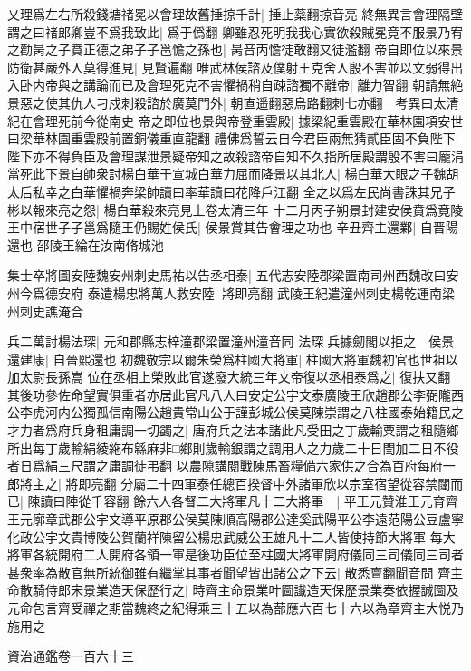 乂理爲左右所殺錢塘禇冕以會理故舊捶掠千計|{
	捶止蘂翻掠音亮}
終無異言會理隔壁謂之曰禇郎卿豈不爲我致此|{
	爲于僞翻}
卿雖忍死明我我心實欲殺賊冕竟不服景乃宥之勸昺之子賁正德之弟子子邕憺之孫也|{
	昺音丙憺徒敢翻又徒濫翻}
帝自即位以來景防衛甚嚴外人莫得進見|{
	見賢遍翻}
唯武林侯諮及僕射王克舍人殷不害並以文弱得出入卧内帝與之講論而已及會理死克不害懼禍稍自疎諮獨不離帝|{
	離力智翻}
朝請無絶景惡之使其仇人刁戍刺殺諮於廣莫門外|{
	朝直遥翻惡烏路翻刺七亦翻　考異曰太清紀在會理死前今從南史}
帝之即位也景與帝登重雲殿|{
	據梁紀重雲殿在華林園項安世曰梁華林園重雲殿前置銅儀重直龍翻}
禮佛爲誓云自今君臣兩無猜貳臣固不負陛下陛下亦不得負臣及會理謀泄景疑帝知之故殺諮帝自知不久指所居殿謂殷不害曰龐涓當死此下景自帥衆討楊白華于宣城白華力屈而降景以其北人|{
	楊白華大眼之子魏胡太后私幸之白華懼禍奔梁帥讀曰率華讀曰花降戶江翻}
全之以爲左民尚書誅其兄子彬以報來亮之怨|{
	楊白華殺來亮見上卷太清三年}
十二月丙子朔景封建安侯賁爲竟陵王中宿世子子邕爲隨王仍賜姓侯氏|{
	侯景賞其告會理之功也}
辛丑齊主還鄴|{
	自晋陽還也}
邵陵王綸在汝南脩城池

集士卒將圖安陸魏安州刺史馬祐以告丞相泰|{
	五代志安陸郡梁置南司州西魏改曰安州今爲德安府}
泰遣楊忠將萬人救安陸|{
	將即亮翻}
武陵王紀遣潼州刺史楊乾運南梁州刺史譙淹合

兵二萬討楊法琛|{
	元和郡縣志梓潼郡梁置潼州潼音同}
法琛兵據劒閣以拒之　侯景還建康|{
	自晉熙還也}
初魏敬宗以爾朱榮爲柱國大將軍|{
	柱國大將軍魏初官也世祖以加太尉長孫嵩}
位在丞相上榮敗此官遂廢大統三年文帝復以丞相泰爲之|{
	復扶又翻}
其後功參佐命望實俱重者亦居此官凡八人曰安定公宇文泰廣陵王欣趙郡公李弼隴西公李虎河内公獨孤信南陽公趙貴常山公于謹彭城公侯莫陳崇謂之八柱國泰始籍民之才力者爲府兵身租庸調一切蠲之|{
	唐府兵之法本諸此凡受田之丁歲輸粟謂之租隨鄉所出每丁歲輸絹綾絁布緜麻非□鄉則歲輸銀謂之調用人之力歲二十日閏加二日不役者日爲絹三尺謂之庸調徒弔翻}
以農隙講閱戰陳馬畜糧備六家供之合為百府每府一郎將主之|{
	將即亮翻}
分屬二十四軍泰任總百揆督中外諸軍欣以宗室宿望從容禁闥而已|{
	陳讀曰陣從千容翻}
餘六人各督二大將軍凡十二大將軍　|{
	平王元贊淮王元育齊王元廓章武郡公宇文導平原郡公侯莫陳順高陽郡公達奚武陽平公李遠范陽公豆盧寧化政公宇文貴博陵公賀蘭祥陳留公楊忠武威公王雄凡十二人皆使持節大將軍}
每大將軍各統開府二人開府各領一軍是後功臣位至柱國大將軍開府儀同三司儀同三司者甚衆率為散官無所統御雖有繼掌其事者聞望皆出諸公之下云|{
	散悉亶翻聞音問}
齊主命散騎侍郎宋景業造天保歷行之|{
	時齊主命景業叶圖䜟造天保歷景業奏依握誠圖及元命包言齊受禪之期當魏終之紀得乘三十五以為蔀應六百七十六以為章齊主大悦乃施用之}


資治通鑑卷一百六十三

